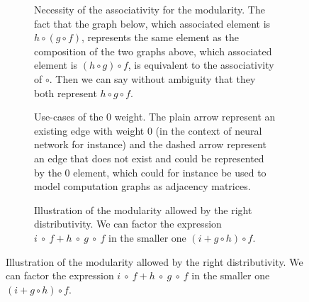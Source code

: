 \documentclass[11pt,a4paper]{article}
\theoremstyle{definition}
\begin{document}
\begin{figure}
\begin{subfigure}{\textwidth}
		\caption{Necessity of the associativity for the modularity. The fact that the graph below, which associated element is $h\circ (g \circ f)$, represents the same element as the composition of the two graphs above, which associated element is $(h \circ g) \circ f$, is equivalent to the associativity of $\circ$. Then we can say without ambiguity that they both represent $h \circ g \circ f$.}
		\label{subfig:drawings_comp}
	\end{subfigure}

	\begin{subfigure}{\textwidth}
		\centering
		\caption{Use-cases of the 0 weight. The plain arrow represent an existing edge with weight 0 (in the context of neural network for instance) and the dashed arrow represent an edge that does not exist and could be represented by the 0 element, which could for instance be used to model computation graphs as adjacency matrices.}
		\label{subfig:drawings_zero}
	\end{subfigure}

	\begin{subfigure}{\textwidth}
		\centering
		\caption{Illustration of the modularity allowed by the right distributivity. We can factor the expression $i~\circ~f+h~\circ~g~\circ~f$ in the smaller one $(i + g \circ h) \circ f$.}
		\label{subfig:drawings_distr}
	\end{subfigure}


\end{figure}
\end{document}
